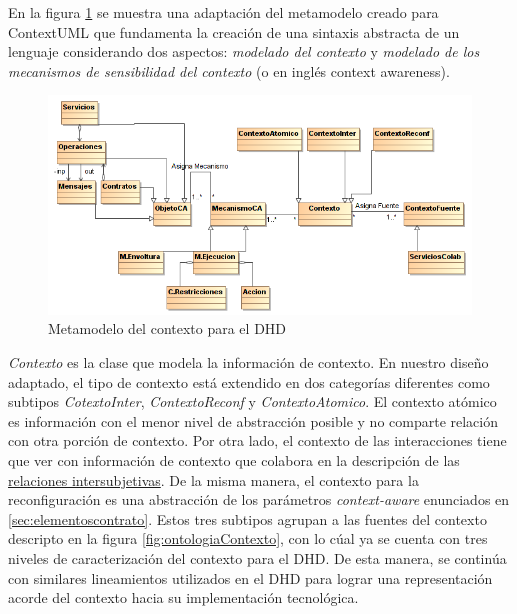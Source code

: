 En la figura \ref{fig:contextMetamodel} se muestra una adaptación del
metamodelo creado para ContextUML\cite{contextUML} que fundamenta la
creación de una sintaxis abstracta de un lenguaje considerando dos
aspectos:
\textit{modelado del contexto} y \textit{modelado de los mecanismos
de sensibilidad del contexto} (o en inglés context awareness).


\begin{figure} 
\begin{center}
 \includegraphics [width=5 in,totalheight=3 in]
{Ch1/Figuras/ContextoDHD}
\caption {Metamodelo del contexto para el DHD}
\label{fig:contextMetamodel}
\end{center}
\end{figure}



\textit{Contexto} es la clase que modela la información de contexto. En nuestro
diseño adaptado, el tipo de contexto está extendido en dos categorías
diferentes como subtipos \textit{CotextoInter}, \textit{ContextoReconf} y
\textit{ContextoAtomico}. El contexto atómico es información con el menor
nivel de abstracción posible y no comparte relación con otra porción de
contexto. Por otra lado, el contexto de las interacciones tiene que ver con
información de contexto que colabora en la descripción de las 
\hyperref[intersubjetivas]{relaciones intersubjetivas}. De la misma manera, el
contexto para la reconfiguración es una abstracción de los parámetros
\textit{context-aware} enunciados en \ref{sec:elementoscontrato}. Estos tres
subtipos agrupan a las fuentes del contexto descripto en la figura
\ref{fig:ontologiaContexto}, con lo cúal ya se cuenta con tres niveles de
caracterización del contexto para el DHD. De esta manera, se continúa con similares lineamientos utilizados en el DHD para lograr una representación
acorde del contexto hacia su implementación tecnológica. 


